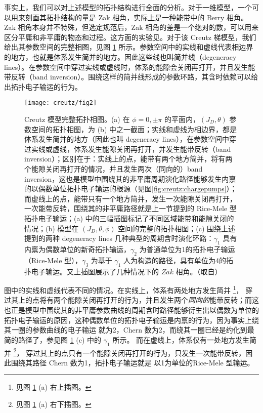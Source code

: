 事实上，我们可以对上述模型的拓扑结构进行全面的分析。对于一维模型，一个可以用来刻画其拓扑结构的量是 Zak 相角\cite{zak1989}，实际上是一种能带中的 Berry 相角。Zak 相角本身并不特殊，但选定规范后，Zak 相角的差是一个绝对的数，可以用来区分平庸和非平庸的物态和过程。这方面的实验见。对于该 Creutz 梯模型，我们给出其参数空间的完整相图，见图 \ref{fig:creutz:topophase} 所示。参数空间中的实线和虚线代表相边界的地方，也就是体系发生简并的地方。因此这些线也叫简并线（degeneracy lines）。在参数空间中穿过实线或虚线时，体系的能隙会关闭再打开，并且发生能带反转（band inversion）\cite{topobook}。围绕这样的简并线形成的参数环路，其含时依赖可以给出拓扑电子输运的行为。
\begin{figure}[!htb]
\centering
\texttt{[image: creutz/fig2]}
\caption{Creutz 模型完整拓扑相图。(a) 在 $\phi=0,\pm\pi$ 的平面内，$(J_D, \theta)$ 参数空间的拓扑相图，为 (b) 中之一截面；实线和虚线为相边界，都是体系发生简并的地方（因此也叫 degeneracy lines），在参数空间中穿过实线或虚线，体系发生能隙关闭再打开，并发生能带反转（band inversion）；区别在于：实线上的点，能带有两个地方简并，将有两个能隙关闭再打开的情况，并且发生两次（同向的）band inversion，这也是模型中围绕其的非平庸周期演化路径能够发生内禀的以偶数单位拓扑电子输运的根源（见图\ref{fig:creutz:chargepumps}）；而虚线上的点，能带只有一个地方简并，发生一次能隙关闭再打开，一次能带反转，围绕其的非平庸路径就是上一节提到的 Rice-Mele 型拓扑电子输运；(a) 中的三幅插图标记了不同区域能带和能隙关闭的情况；(b) 模型在 $(J_D, \theta, \phi)$ 空间的完整的拓扑相图；(c) 围绕上述提到的两种 degeneracy lines 几种典型的周期含时演化环路：$\gamma_1$ 具有内禀为偶数单位的新奇拓扑输运，$\gamma_2$ 为普通单位为1的拓扑电子输运（Rice-Mele 型），$\gamma_3$ 为基于 $\gamma_1$ 人为构造的路径，具有单位为4的拓扑电子输运。又上插图展示了几种情况下的 $Zak$ 相角\cite{creutz}。（取自）}
\label{fig:creutz:topophase}
\end{figure}

图中的实线和虚线代表不同的情况。在实线上，体系有两处地方发生简并
\footnote{见图 \ref{fig:creutz:topophase} (a) 右上插图。}，
穿过其上的点将有两个能隙关闭再打开的行为，并且发生两个\textit{同向的}能带反转；而这也正是模型中围绕其的非平庸参数曲线的周期含时路径能够衍生出以偶数为单位的拓扑电子输运的原因，这种偶数单位的拓扑电子输运是内禀的行为，因为事实上绕其\textit{一}圈的参数曲线的电子输运 就为2，Chern 数为2，而绕其一圈已经是约化到最简的路径了，参见图 \ref{fig:creutz:topophase} (c) 中的 $\gamma_1$ 所示。
而在虚线上，体系仅有一处地方发生简并
\footnote{见图 \ref{fig:creutz:topophase} (a) 右下插图。}，
穿过其上的点只有一个能隙关闭再打开的行为，只发生一次能带反转，因此围绕其路径 Chern 数为1，拓扑电子输运就是 以1为单位的Rice-Mele 型输运。

